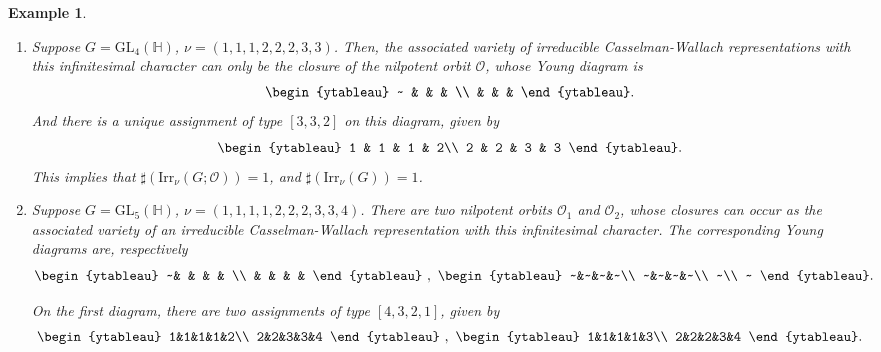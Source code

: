 \documentclass[12pt, a4paper]{amsart}
\numberwithin{equation}{section}
\newtheorem{examp}[thm]{Example}
\newcommand{\BH}{{\mathbb {H}}}
\newcommand{\CO}{{\mathcal {O}}}
\newcommand{\GL}{{\mathrm{GL}}}
\newcommand{\Irr}{{\mathrm{Irr}}}
\begin{document}
\begin{examp}
    \begin{enumerate}
    \item  Suppose $G = \GL_{4}(\BH)$, $\nu = (1,1,1,2,2,2,3,3)$.
           Then, the associated variety of irreducible Casselman-Wallach representations with this infinitesimal character can only be the closure of the nilpotent orbit $\CO$, whose Young diagram is
           \[
                \begin{ytableau}
                ~ & & & \\
                 & & & 
                \end{ytableau}.
           \]
            And there is a unique assignment of type $[3,3,2]$ on this diagram, given by
            \[
                \begin{ytableau}
                    1 & 1 & 1 & 2\\
                    2 & 2 & 3 & 3
                \end{ytableau}.
            \]
            This implies that $\sharp(\Irr_{\nu}(G;\CO)) = 1$, and $\sharp(\Irr_{\nu}(G)) = 1$.

    \item   Suppose $G = \GL_{5}(\BH)$, $\nu = (1,1,1,1,2,2,2,3,3,4)$.       
            There are two nilpotent orbits $\CO_1$ and $\CO_2$, whose closures can occur as the associated variety of an irreducible Casselman-Wallach representation with this infinitesimal character. The corresponding Young diagrams are, respectively
            \[
                \begin{ytableau}
                    ~& & & & \\
                    & & & &
                \end{ytableau}
                ~,~
                \begin{ytableau}
                    ~&~&~&~\\
                    ~&~&~&~\\
                    ~\\
                    ~
                \end{ytableau}.
            \]
            
            On the first diagram, there are two assignments of type $[4,3,2,1]$, given by
            \[
                \begin{ytableau}
                    1&1&1&1&2\\
                    2&2&3&3&4
                \end{ytableau}
                ~,~
                \begin{ytableau}
                    1&1&1&1&3\\
                    2&2&2&3&4
                \end{ytableau}.
            \]
            

\end{enumerate}
\end{examp}
\end{document}
